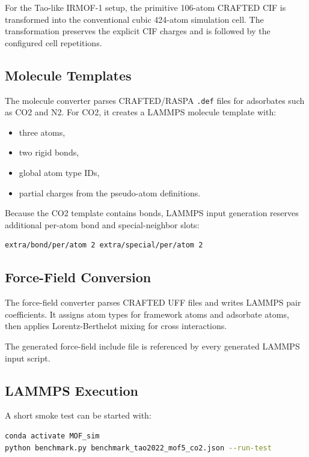 For the Tao-like IRMOF-1 setup, the primitive 106-atom CRAFTED CIF is transformed into the conventional cubic 424-atom simulation cell.
The transformation preserves the explicit CIF charges and is followed by the configured cell repetitions.

\subsection{Molecule Templates}

The molecule converter parses CRAFTED/RASPA \texttt{.def} files for adsorbates such as CO2 and N2.
For CO2, it creates a LAMMPS molecule template with:

\begin{itemize}
    \item three atoms,
    \item two rigid bonds,
    \item global atom type IDs,
    \item partial charges from the pseudo-atom definitions.
\end{itemize}

Because the CO2 template contains bonds, LAMMPS input generation reserves additional per-atom bond and special-neighbor slots:

\begin{lstlisting}
extra/bond/per/atom 2 extra/special/per/atom 2
\end{lstlisting}

\subsection{Force-Field Conversion}

The force-field converter parses CRAFTED UFF files and writes LAMMPS pair coefficients.
It assigns atom types for framework atoms and adsorbate atoms, then applies Lorentz-Berthelot mixing for cross interactions.

The generated force-field include file is referenced by every generated LAMMPS input script.

\subsection{LAMMPS Execution}

A short smoke test can be started with:

\begin{lstlisting}[language=bash]
conda activate MOF_sim
python benchmark.py benchmark_tao2022_mof5_co2.json --run-test
\end{lstlisting}

